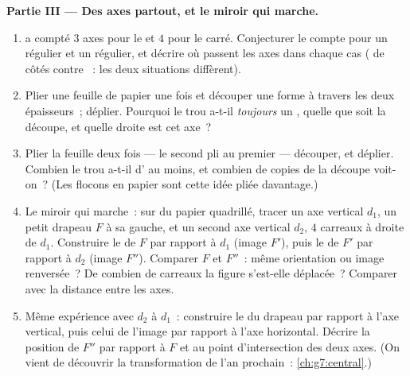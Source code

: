 \begin{problem}
\medskip
\noindent\textbf{Partie III --- Des axes partout, et le miroir qui
marche.}
\begin{enumerate}[resume]
  \item {} a compté $3$ axes pour le
         et $4$ pour le carré. Conjecturer le
        compte pour un  régulier et un  régulier,
        et décrire où passent les axes dans chaque cas ( de côtés contre ~: les deux situations
        diffèrent).
  \item Plier une feuille de papier une fois et découper une forme à
        travers les deux épaisseurs~; déplier. Pourquoi le trou
        a-t-il \emph{toujours} un , quelle que soit
        la découpe, et quelle droite est cet axe~?
  \item Plier la feuille deux fois --- le second pli 
        au premier --- découper, et déplier. Combien le trou a-t-il
        d' au moins, et combien de copies de la
        découpe voit-on~? (Les flocons en papier sont cette idée
        pliée davantage.)
  \item Le miroir qui marche~: sur du papier quadrillé, tracer un
        axe vertical $d_1$, un petit drapeau $F$ à sa gauche, et un
        second axe vertical $d_2$, $4$ carreaux à droite de $d_1$.
        Construire le  de $F$ par rapport à $d_1$ (image
        $F'$), puis le  de $F'$ par rapport à $d_2$ (image
        $F''$). Comparer $F$ et $F''$~: même orientation ou image
        renversée~? De combien de carreaux la figure s'est-elle
        déplacée~? Comparer avec la distance entre les axes.
  \item Même expérience avec $d_2$ \emph{} à $d_1$~:
        construire le  du drapeau par rapport à l'axe
        vertical, puis celui de l'image par rapport à l'axe
        horizontal. Décrire la position de $F''$ par rapport à $F$
        et au point d'intersection des deux axes. (On vient de
        découvrir la transformation de l'an prochain~:
        \cref{ch:g7:central}.)
\end{enumerate}
\end{problem}
